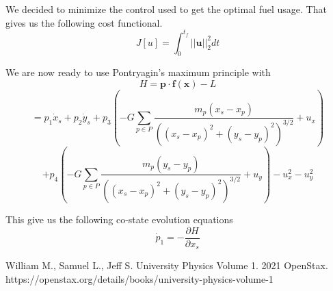 \documentclass[11pt]{amsart}
\begin{document}
We decided to minimize the control used to get the optimal fuel usage. That gives us the following cost functional. 
\[J[u] = \int_{0}^{t_f}||\mathbf{u}||_2^2dt\]

We are now ready to use Pontryagin's maximum principle with 
\[H = \mathbf{p}\cdot\mathbf{f(\mathbf{x})} - L\]
\[= p_1\dot{x}_s + p_2\dot{y}_s + p_3(-G\sum_{p\in{P}}^{}\frac{m_p(x_s - x_p)}{((x_s-x_p)^2+(y_s-y_p)^2)^{3/2}} + u_x)\]
\[+ p_4(-G\sum_{p\in{P}}^{}\frac{m_p(y_s - y_p)}{((x_s-x_p)^2+(y_s-y_p)^2)^{3/2}} + u_y) - u_x^2 - u_y^2\]

This give us the following co-state evolution equations
\[\dot{p}_1 = -\frac{\partial H}{\partial x_s}\]







\FloatBarrier %
\newpage


\begin{thebibliography}{99}
 William M., Samuel L., Jeff S. University Physics Volume 1. 2021 OpenStax. https://openstax.org/details/books/university-physics-volume-1 

\end{thebibliography}
\end{document}

